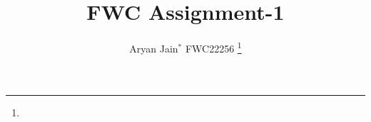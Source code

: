 \documentclass[journal,12pt,twocolumn]{IEEEtran}
\theoremstyle{remark}
\begin{document}



\vspace{3cm}

\title{
FWC Assignment-1
}
\author{ Aryan Jain$^{*}$ FWC22256%
	\thanks{}
	
}


%
%
%

% 
%



% 
\end{document}
